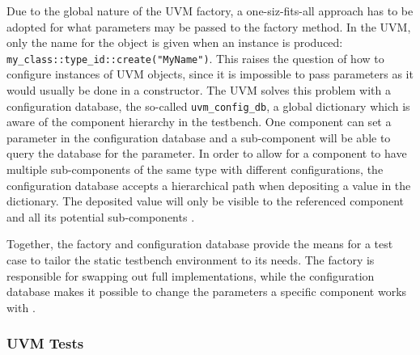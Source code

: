 \documentclass[11pt]{report}
\newcommand{\ttt}{\texttt}
\begin{document}
Due to the global nature of the UVM factory, a one-siz-fits-all approach has to be adopted for what parameters may be
passed to the factory method. In the UVM, only the name for the object is given when an instance is produced:
\ttt{my\_class::type\_id::create("MyName")}. This raises the question of how to configure instances of UVM objects,
since it is impossible to pass parameters as it would usually be done in a constructor. The UVM solves this problem
with a configuration database, the so-called \ttt{uvm\_config\_db}, a global dictionary which is aware of the
component hierarchy in the testbench. One component can set a parameter in the configuration database and a
sub-component will be able to query the database for the parameter. In order to allow for a component to have
multiple sub-components of the same type with different configurations, the configuration database accepts a
hierarchical path when depositing a value in the dictionary. The deposited value will only be visible to the
referenced component and all its potential sub-components \cite{configdb}.

Together, the factory and configuration database provide the means for a test case to tailor the static testbench
environment to its needs. The factory is responsible for swapping out full implementations, while the configuration
database makes it possible to change the parameters a specific component works with \cite[Ch. 4.3]{mehta2018asic}.

\begin{comment}

- components are one step towards a reusable and scalable verification environment, providing concepts and abstractions
- but reuse and scalability also have to be tackled at the programming level

- not alone good enough to provide primitives
- we also need to concern ourselves with software design patterns to create resuable testbenches
- how do we swap out different implementations? -> factory
- how do we specialize an implementation? -> inheritance
- how do we make an implementation configurable? -> configdb

\end{comment}

\subsubsection{UVM Tests} %
\end{document}
